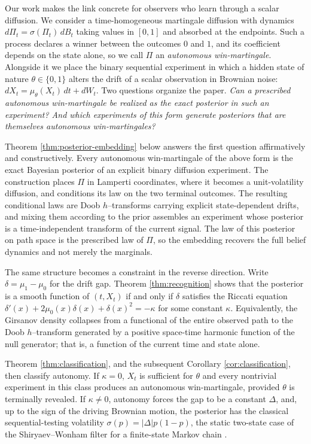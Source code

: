 \documentclass[11pt, reqno]{amsart}
\theoremstyle{plain}
\theoremstyle{remark}
\numberwithin{equation}{section}
\begin{document}
Our work makes the link concrete for observers who learn through a scalar diffusion. We consider a time-homogeneous martingale diffusion with dynamics $d\Pi_t=\sigma(\Pi_t)\,dB_t$ taking values in $[0,1]$ and absorbed at the endpoints. Such a process declares a winner between the outcomes $0$ and $1$, and its coefficient depends on the state alone, so we call $\Pi$ an \emph{autonomous win-martingale}. Alongside it we place the binary sequential experiment in which a hidden state of nature $\theta\in\{0,1\}$ alters the drift of a scalar observation in Brownian noise: $dX_t=\mu_\theta(X_t)\,dt+dW_t$. Two questions organize the paper. \emph{Can a prescribed autonomous win-martingale be realized as the exact posterior in such an experiment? And which experiments of this form generate posteriors that are themselves autonomous win-martingales?}


Theorem \ref{thm:posterior-embedding} below answers the first question affirmatively and constructively. Every autonomous win-martingale of the above form is the exact Bayesian posterior of an explicit binary diffusion experiment. The construction places $\Pi$ in Lamperti coordinates, where it becomes a unit-volatility diffusion, and conditions its law on the two terminal outcomes. The resulting conditional laws are Doob $h$--transforms carrying explicit state-dependent drifts, and mixing them according to the prior assembles an experiment whose posterior is a time-independent transform of the current signal. The law of this posterior on path space is the prescribed law of $\Pi$, so the embedding recovers the full belief dynamics and not merely the marginals.
 
The same structure becomes a constraint in the reverse direction. Write $\delta=\mu_1-\mu_0$ for the drift gap. Theorem \ref{thm:recognition} shows that the posterior is a smooth function of $(t,X_t)$ if and only if $\delta$ satisfies the Riccati equation
$\delta'(x)+2\mu_0(x)\delta(x)+\delta(x)^2=-\kappa$
for some constant $\kappa$. Equivalently, the Girsanov density collapses from a functional of the entire observed path to the Doob $h$--transform generated by a positive space-time harmonic function of the null generator; that is, a function of the current time and state alone.
 
Theorem \ref{thm:classification}, and the subsequent Corollary \ref{cor:classification}, then classify autonomy. If $\kappa=0$, $X_t$ is sufficient for $\theta$ and every nontrivial experiment in this class produces an autonomous win-martingale, provided $\theta$ is terminally revealed. If $\kappa\neq0$, autonomy forces the gap to be a constant $\Delta$, and, up to the sign of the driving Brownian motion, the posterior has the classical sequential-testing volatility $\sigma(p)=|\Delta|p(1-p)$, the static two-state case of the Shiryaev--Wonham filter for a finite-state Markov chain \cite{shiryaev1967two,wonham1965some}.
 
\end{document}
